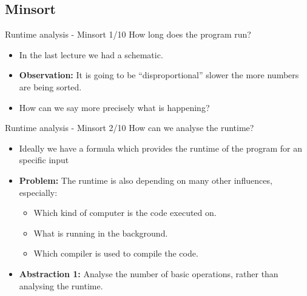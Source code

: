 
\subsection{Minsort}


\begin{frame}{Runtime analysis - Minsort 1/10}
 How long does the program run?
 \begin{itemize}
    \item
      In the last lecture we had a schematic.
    \item
      \textbf{Observation:} It is going to be \enquote{disproportional} slower
      the more numbers are being sorted.
    \item
      How can we say more precisely what is happening?
  \end{itemize}
\end{frame}


\begin{frame}{Runtime analysis - Minsort 2/10}
  How can we analyse the runtime?
  \begin{itemize}
    \item Ideally we have a formula which provides the runtime of the
      program for an specific input
    \item
      \textbf{Problem:} The runtime is also depending on many other
        influences, especially:
      \begin{itemize}
        \item
          Which kind of computer is the code executed on.
        \item What is running in the background.
        \item Which compiler is used to compile the code.
      \end{itemize}
    \item
      \textbf{Abstraction 1:} Analyse the number of basic operations,
        rather than analysing the runtime.
  \end{itemize}
\end{frame}


